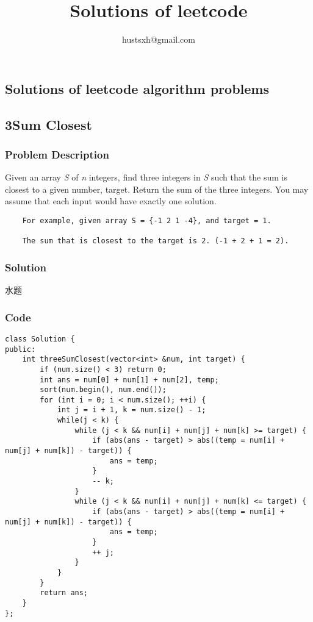 \documentclass[courier]{article}
\begin{document}
\begin{CJK*}{UTF8}{gkai}
\CJKindent
\title{Solutions of leetcode}
\author{hustsxh@gmail.com}

\maketitle

\section{Solutions of leetcode algorithm problems}
	

\subsection{ 3Sum Closest }

\subsubsection*{Problem Description}
Given an array \emph{S} of \emph{n} integers, find three integers in \emph{S} such that the sum is closest to a given number, target. Return the sum of the three integers. You may assume that each input would have exactly one solution.

\begin{verbatim}
    For example, given array S = {-1 2 1 -4}, and target = 1.

    The sum that is closest to the target is 2. (-1 + 2 + 1 = 2).
\end{verbatim}


\subsubsection*{Solution}
水题

\subsubsection*{Code}
\begin{lstlisting}
class Solution {
public:
    int threeSumClosest(vector<int> &num, int target) {
        if (num.size() < 3) return 0;
        int ans = num[0] + num[1] + num[2], temp;
        sort(num.begin(), num.end());
        for (int i = 0; i < num.size(); ++i) {
            int j = i + 1, k = num.size() - 1;
            while(j < k) {
                while (j < k && num[i] + num[j] + num[k] >= target) {
                    if (abs(ans - target) > abs((temp = num[i] + num[j] + num[k]) - target)) {
                        ans = temp;
                    }
                    -- k;
                }
                while (j < k && num[i] + num[j] + num[k] <= target) {
                    if (abs(ans - target) > abs((temp = num[i] + num[j] + num[k]) - target)) {
                        ans = temp;
                    }
                    ++ j;
                }
            }
        }
        return ans;
    }
}; 
\end{lstlisting}



\end{CJK*}
\end{document}
